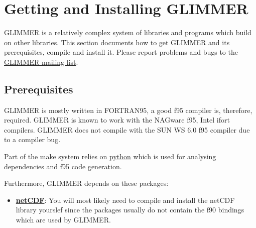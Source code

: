 \section{Getting and Installing GLIMMER}
GLIMMER is a relatively complex system of libraries and programs which build on other libraries. This section documents how to get GLIMMER and its prerequisites, compile and install it. Please report problems and bugs to the \href{http://forge.nesc.ac.uk/mailman/listinfo/glimmer-discuss}{GLIMMER mailing list}.

\subsection{Prerequisites}
GLIMMER is mostly written in FORTRAN95, a good f95 compiler is, therefore, required. GLIMMER is known to work with the NAGware f95, Intel ifort compilers. GLIMMER does not compile with the SUN WS 6.0 f95 compiler due to a compiler bug.

Part of the make system relies on \href{http://www.python.org}{python} which is used for analysing dependencies and f95 code generation.

Furthermore, GLIMMER depends on these packages:
\begin{itemize}
\item \href{http://www.unidata.ucar.edu/packages/netcdf/index.html}{{\bf netCDF}}: You will most likely need to compile and install the netCDF library yourslef since the packages usually do not contain the f90 bindings which are used by GLIMMER.

\end{itemize}
